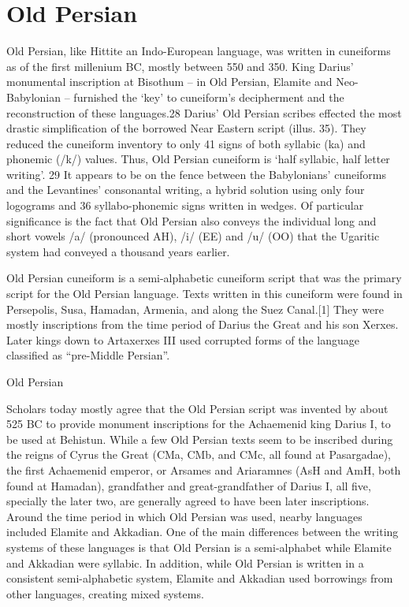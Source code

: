 \section{Old Persian}
\label{s:oldpersian}


Old Persian, like Hittite an Indo-European language, was written in cuneiforms as of the first millenium BC, mostly between 550 and 350. King Darius’ monumental inscription at
Bisothum – in Old Persian, Elamite and Neo-Babylonian – furnished
the ‘key’ to cuneiform’s decipherment and the reconstruction
of these languages.28 Darius’ Old Persian scribes
effected the most drastic simplification of the borrowed Near
Eastern script (illus. 35). They reduced the cuneiform inventory
to only 41 signs of both syllabic (ka) and phonemic (/k/) values.
Thus, Old Persian cuneiform is ‘half syllabic, half letter writing’.
29 It appears to be on the fence between the Babylonians’
cuneiforms and the Levantines’ consonantal writing, a hybrid
solution using only four logograms and 36 syllabo-phonemic
signs written in wedges. Of particular significance is the fact
that Old Persian also conveys the individual long and short
vowels /a/ (pronounced AH), /i/ (EE) and /u/ (OO) that the
Ugaritic system had conveyed a thousand years earlier.

Old Persian cuneiform is a semi-alphabetic cuneiform script that was the primary script for the Old Persian language. Texts written in this cuneiform were found in Persepolis, Susa, Hamadan, Armenia, and along the Suez Canal.[1] They were mostly inscriptions from the time period of Darius the Great and his son Xerxes. Later kings down to Artaxerxes III used corrupted forms of the language classified as “pre-Middle Persian”.

\begin{scriptexample}[]{Old Persian}
\end{scriptexample}

Scholars today mostly agree that the Old Persian script was invented by about 525 BC to provide monument inscriptions for the Achaemenid king Darius I, to be used at Behistun. While a few Old Persian texts seem to be inscribed during the reigns of Cyrus the Great (CMa, CMb, and CMc, all found at Pasargadae), the first Achaemenid emperor, or Arsames and Ariaramnes (AsH and AmH, both found at Hamadan), grandfather and great-grandfather of Darius I, all five, specially the later two, are generally agreed to have been later inscriptions.
Around the time period in which Old Persian was used, nearby languages included Elamite and Akkadian. One of the main differences between the writing systems of these languages is that Old Persian is a semi-alphabet while Elamite and Akkadian were syllabic. In addition, while Old Persian is written in a consistent semi-alphabetic system, Elamite and Akkadian used borrowings from other languages, creating mixed systems.
\medskip

